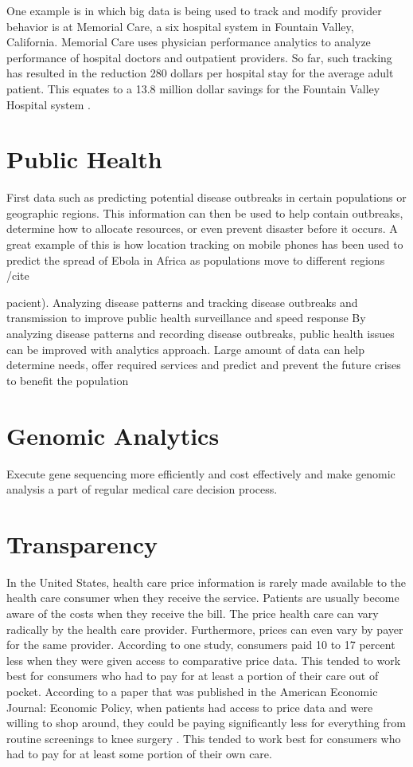 \documentclass[sigconf]{acmart}
\begin{document}
One example is in which big data is being used to track and modify provider behavior is at Memorial Care, a six hospital system in Fountain Valley, California. Memorial Care uses physician performance analytics to analyze performance of hospital doctors and outpatient providers.  So far, such tracking has resulted in the reduction 280 dollars per hospital stay for the average adult patient. This equates to a 13.8 million dollar savings for the Fountain Valley Hospital system \cite{www-google-Datafloq}.
 

\section{Public Health}
First data such as predicting potential disease outbreaks in certain populations or geographic regions. This information can then be used to help contain outbreaks, determine how to allocate resources, or even prevent disaster before it occurs. A great example of this is how location tracking on mobile phones has been used to predict the spread of Ebola in Africa as populations move to different regions /cite{pacient). Analyzing disease patterns and tracking disease outbreaks and transmission to improve public health surveillance and speed response
By analyzing disease patterns and recording disease outbreaks, public health issues can be improved with analytics approach. Large amount of data can help determine needs, offer required services and predict and prevent the future crises to benefit the population
\section{Genomic Analytics}
Execute gene sequencing more efficiently and cost effectively and make genomic analysis a part of regular medical care decision process. 

\section{Transparency}
In the United States, health care price information is rarely made available to the health care consumer when they receive the service. Patients are usually become aware of the costs when they receive the bill. The price health care can vary radically by the health care provider. Furthermore, prices can even vary by payer for the same provider.  According to one study, consumers paid 10 to 17 percent less when they were given access to comparative price data.  This tended to work best for consumers who had to pay for at least a portion of their care out of pocket. According to a paper that was published in the American Economic Journal: Economic Policy, when patients had access to price data and were willing to shop around, they could be paying significantly less for everything from routine screenings to knee surgery \cite{www-google-transparent}.  This tended to work best for consumers who had to pay for at least some portion of their own care. 

}
\end{document}
